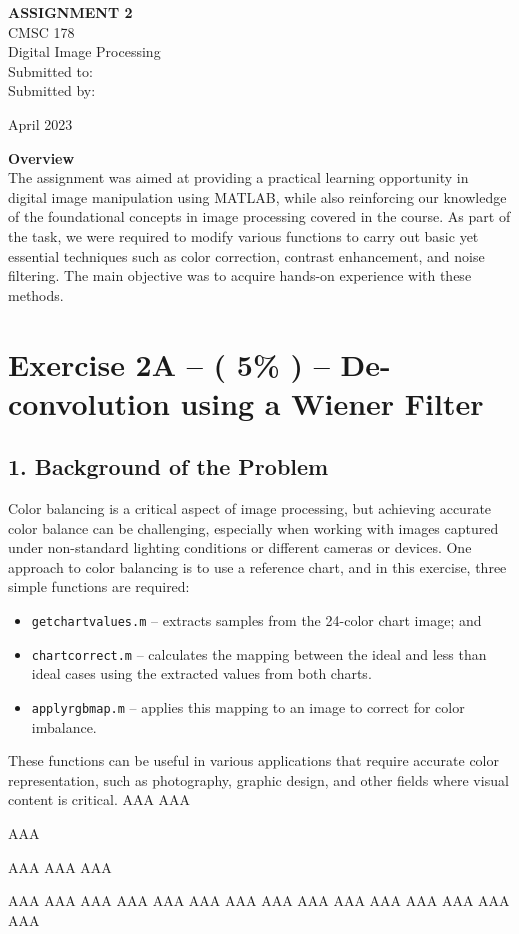 \documentclass{article}
\newcommand{\mytitlepage}{
    \begin{titlepage}
        \begin{center}
            \vspace*{1.5cm}
            
            \LARGE\textbf{ASSIGNMENT 2}
            \vspace{0.5cm}\\
            \Large CMSC 178\\
            \Large Digital Image Processing\\
            \vspace{3cm}
            Submitted to:\\
            
            \vspace{2.5cm}
            Submitted by:\\
            
            \vspace{4cm}
            
	April 2023
            
            \vspace{1.3cm}
        \end{center}
        \large\textbf{Overview}\\
        The assignment was aimed at providing a practical learning opportunity in digital image manipulation using MATLAB, while also reinforcing our knowledge of the foundational concepts in image processing covered in the course. As part of the task, we were required to modify various functions to carry out basic yet essential techniques such as color correction, contrast enhancement, and noise filtering. The main objective was to acquire hands-on experience with these methods.
    \end{titlepage}
}
\begin{document}
\mytitlepage

\newpage
	\section*{Exercise 2A –  ( 5\% ) – De-convolution using a Wiener Filter}
	
	\subsection*{1. Background of the Problem}
	Color balancing is a critical aspect of image processing, but achieving accurate color balance can be challenging, especially when working with images captured under non-standard lighting conditions or different cameras or devices. One approach to color balancing is to use a reference chart, and in this exercise, three simple functions are required:
	\begin{itemize}
	\item {\texttt{get\textunderscore chart\textunderscore values.m}} – extracts samples from the 24-color chart image; and 
	\item {\texttt{chart\textunderscore correct.m}}  – calculates the mapping between the ideal and less than ideal cases using the extracted values from both charts. 
	\item {\texttt{apply\textunderscore rgb\textunderscore map.m}} –  applies this mapping to an image to correct for color imbalance.
	\end{itemize}
 These functions can be useful in various applications that require accurate color representation, such as photography, graphic design, and other fields where visual content is critical.
 AAA
 AAA

 AAA

 AAA
 AAA
 AAA
 
 AAA
 AAA
 AAA
 AAA
 AAA
 AAA
 AAA
 AAA
 AAA
 AAA
 AAA
 AAA
 AAA
 AAA
 AAA
 
\end{document}

